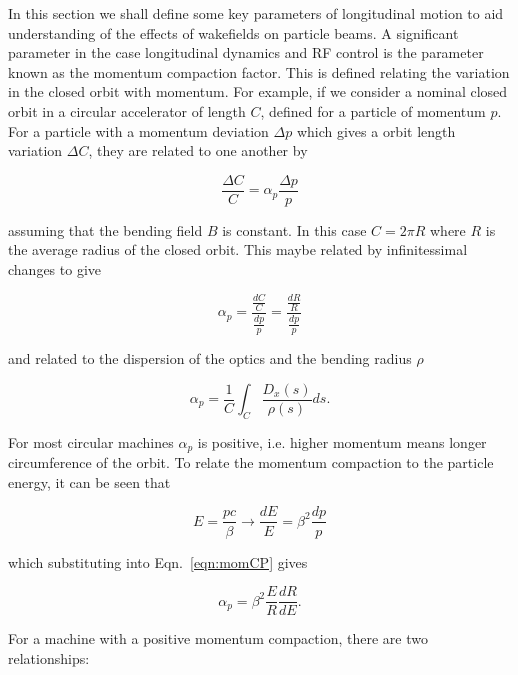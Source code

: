 \label{app:long_motion}

In this section we shall define some key parameters of longitudinal motion to aid understanding of the effects of wakefields on particle beams. A significant parameter in the case longitudinal dynamics and RF control is the parameter known as the momentum compaction factor. This is defined relating the variation in the closed orbit with momentum. For example, if we consider a nominal closed orbit in a circular accelerator of length $C$, defined for a particle of momentum $p$. For a particle with a momentum deviation $\Delta p$ which gives a orbit length variation $\Delta C$, they are related to one another by

\begin{equation}
\frac{\Delta C}{C} = \alpha_{p} \frac{\Delta p}{p}
\end{equation}

assuming that the bending field $B$ is constant. In this case $C=2\pi R$ where $R$ is the average radius of the closed orbit. This maybe related by infinitessimal changes to give

\begin{equation}
\alpha_{p} = \frac{\frac{dC}{C}}{\frac{dp}{p}} = \frac{\frac{dR}{R}}{\frac{dp}{p}}
\label{eqn:momCP}
\end{equation}

and related to the dispersion of the optics and the bending radius $\rho$

\begin{equation}
\alpha_{p} = \frac{1}{C}\int_{C}\frac{D_{x} \left( s \right)}{\rho\left( s \right)} ds.
\end{equation}

For most circular machines $\alpha_{p}$ is positive, i.e. higher momentum means longer circumference of the orbit. To relate the momentum compaction to the particle energy, it can be seen that 

\begin{equation}
E = \frac{pc}{\beta} \rightarrow \frac{dE}{E} = \beta^{2}\frac{dp}{p}
\end{equation}

which substituting into Eqn.~\ref{eqn:momCP} gives

\begin{equation}
\alpha_{p} = \beta^{2}\frac{E}{R}\frac{dR}{dE}.
\end{equation}

For a machine with a positive momentum compaction, there are two relationships:

